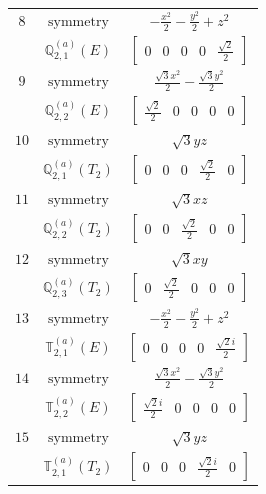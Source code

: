 \documentclass[fleqn,8pt,landscape]{jsarticle}
\begin{document}
\begin{longtable}{ccc}
$ 8 $ & $ \text{symmetry} $ & $ - \frac{x^{2}}{2} - \frac{y^{2}}{2} + z^{2} $ \\
$  $ & $ \mathbb{Q}_{2,1}^{(a)}(E) $ & $ \begin{bmatrix} 0 & 0 & 0 & 0 & \frac{\sqrt{2}}{2} \end{bmatrix} $ \\ \hline
$ 9 $ & $ \text{symmetry} $ & $ \frac{\sqrt{3} x^{2}}{2} - \frac{\sqrt{3} y^{2}}{2} $ \\
$  $ & $ \mathbb{Q}_{2,2}^{(a)}(E) $ & $ \begin{bmatrix} \frac{\sqrt{2}}{2} & 0 & 0 & 0 & 0 \end{bmatrix} $ \\ \hline
$ 10 $ & $ \text{symmetry} $ & $ \sqrt{3} y z $ \\
$  $ & $ \mathbb{Q}_{2,1}^{(a)}(T_{2}) $ & $ \begin{bmatrix} 0 & 0 & 0 & \frac{\sqrt{2}}{2} & 0 \end{bmatrix} $ \\ \hline
$ 11 $ & $ \text{symmetry} $ & $ \sqrt{3} x z $ \\
$  $ & $ \mathbb{Q}_{2,2}^{(a)}(T_{2}) $ & $ \begin{bmatrix} 0 & 0 & \frac{\sqrt{2}}{2} & 0 & 0 \end{bmatrix} $ \\ \hline
$ 12 $ & $ \text{symmetry} $ & $ \sqrt{3} x y $ \\
$  $ & $ \mathbb{Q}_{2,3}^{(a)}(T_{2}) $ & $ \begin{bmatrix} 0 & \frac{\sqrt{2}}{2} & 0 & 0 & 0 \end{bmatrix} $ \\ \hline
$ 13 $ & $ \text{symmetry} $ & $ - \frac{x^{2}}{2} - \frac{y^{2}}{2} + z^{2} $ \\
$  $ & $ \mathbb{T}_{2,1}^{(a)}(E) $ & $ \begin{bmatrix} 0 & 0 & 0 & 0 & \frac{\sqrt{2} i}{2} \end{bmatrix} $ \\ \hline
$ 14 $ & $ \text{symmetry} $ & $ \frac{\sqrt{3} x^{2}}{2} - \frac{\sqrt{3} y^{2}}{2} $ \\
$  $ & $ \mathbb{T}_{2,2}^{(a)}(E) $ & $ \begin{bmatrix} \frac{\sqrt{2} i}{2} & 0 & 0 & 0 & 0 \end{bmatrix} $ \\ \hline
$ 15 $ & $ \text{symmetry} $ & $ \sqrt{3} y z $ \\
$  $ & $ \mathbb{T}_{2,1}^{(a)}(T_{2}) $ & $ \begin{bmatrix} 0 & 0 & 0 & \frac{\sqrt{2} i}{2} & 0 \end{bmatrix} $ \\ \hline

\end{longtable}
\end{document}
